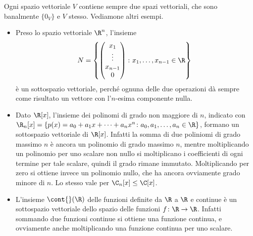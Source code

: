 Ogni spazio vettoriale $V$ contiene sempre due spazi vettoriali, che sono banalmente $\{0_V\}$ e $V$ stesso.
Vediamone altri esempi.
\begin{itemize}
	\item Preso lo spazio vettoriale $\R^n$, l'insieme
		\begin{equation*}
			N=\left\{
			\begin{pmatrix}
				x_1\\\vdots\\x_{n-1}\\0
			\end{pmatrix}
			\colon x_1,\dots,x_{n-1}\in\R\right\}
		\end{equation*}
		è un sottospazio vettoriale, perché ognuna delle due operazioni dà sempre come risultato un vettore con l'$n$-esima componente nulla.
	\item Dato $\R[x]$, l'insieme dei polinomi di grado non maggiore di $n$, indicato con $\R_n[x]=\{p(x)=a_0+a_1x+\dots+a_nx^n\colon a_0,a_1,\dots,a_n\in\R\}$, formano un sottospazio vettoriale di $\R[x]$.
		Infatti la somma di due poliniomi di grado massimo $n$ è ancora un polinomio di grado massimo $n$, mentre moltiplicando un polinomio per uno scalare non nullo si moltiplicano i coefficienti di ogni termine per tale scalare, quindi il grado rimane immutato.
		Moltiplicando per zero si ottiene invece un polinomio nullo, che ha ancora ovviamente grado minore di $n$.
		Lo stesso vale per $\C_n[x]\leq \C[x]$.
	\item L'insieme $\cont{}(\R)$ delle funzioni definite da $\R$ a $\R$ e continue è un sottospazio vettoriale dello spazio delle funzioni $f\colon\R\to\R$.
		Infatti sommando due funzioni continue si ottiene una funzione continua, e ovviamente anche moltiplicando una funzione continua per uno scalare.
\end{itemize}

